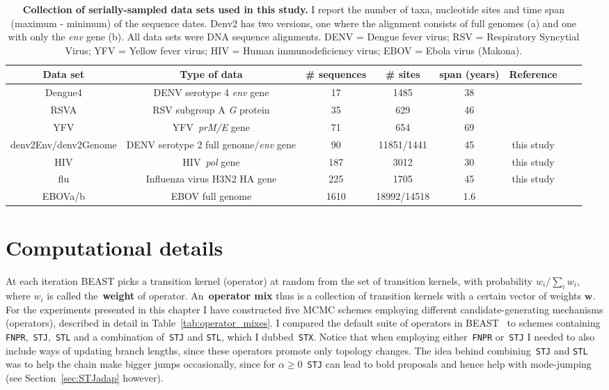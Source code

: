 \begin{sidewaystable}[!ht]
\caption[Collection of serially-sampled data sets.]{\textbf{Collection of serially-sampled data sets used in this study.}
I report the number of taxa, nucleotide sites and time span (maximum - minimum) of the sequence dates.
Denv2 has two versions, one where the alignment consists of full genomes  (a) and one with only the \textit{env} gene (b).
All data sets were DNA sequence alignments.
DENV = Dengue fever virus; RSV = Respiratory Syncytial Virus; YFV = Yellow fever virus; HIV = Human immunodeficiency virus; EBOV = Ebola virus (Makona).
}
\begin{center}
\begin{tabular}{cccccccc}
\toprule
Data set & Type of data	& \# sequences & \# sites & span (years) & Reference \\             
\midrule
Dengue4 & DENV serotype 4 \textit{env} gene& 17  & 1485 & 38 & \cite{Lanciotti1997}\\
RSVA & RSV subgroup A \textit{G} protein & 35 & 629 & 46& \cite{Zlateva2004}\\
YFV & YFV~\textit{prM/E} gene & 71  & 654 & 69 & \cite{Bryant2007}\\
denv2Env/denv2Genome & DENV serotype 2 full genome/\textit{env} gene & 90  & 11851/1441 & 45 & this study\\
HIV & HIV~\textit{pol} gene & 187 & 3012 & 30 & this study\\
flu & Influenza virus H3N2 HA gene & 225  & 1705 & 45 & this study\\
EBOVa/b & EBOV full genome & 1610 & 18992/14518 & 1.6 &~\cite{Dudas2017} \\
\bottomrule
\end{tabular}
\end{center}
 \label{tab:datasets}
\end{sidewaystable}

\section{Computational details}
\label{sec:compdetails}

At each iteration BEAST picks a transition kernel (operator) at random from the set of transition kernels, with probability $w_i/\sum_i w_i$, where $w_i$ is called the~\textbf{weight} of operator.
An~\textbf{operator mix} thus is a collection of transition kernels with a certain vector of weights $\boldsymbol w$.
For the experiments presented in this chapter I have constructed five MCMC schemes employing different candidate-generating mechanisms (operators), described in detail in Table~\ref{tab:operator_mixes}.
I compared the default suite of operators in BEAST~\citep{Drummond2012} to schemes containing \verb|FNPR|,~\verb|STJ|,~\verb|STL| and a combination of~\verb|STJ| and \verb|STL|, which I dubbed~\verb|STX|.
Notice that when employing either~\verb|FNPR| or~\verb|STJ| I needed to also include ways of updating branch lengths, since these operators promote only topology changes.
The idea behind combining~\verb|STJ| and \verb|STL| was to help the chain make bigger jumps occasionally, since for $\alpha \geq 0$~\verb|STJ| can lead to bold proposals and hence help with mode-jumping (see Section~\ref{sec:STJadap} however).

